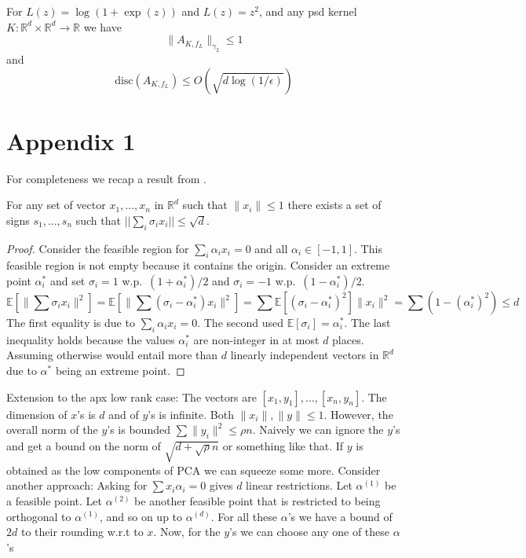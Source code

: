 \documentclass[anon,12pt]{colt2019} %
\newcommand{\R}{\mathbb{R}}
\newcommand{\E}{\mathbb{E}}
\newcommand{\eps}{\epsilon}
\newcommand{\disc}{\text{disc}}
\begin{document}
\begin{corollary}
For $L(z)=\log(1+\exp(z))$ and $L(z) = z^2$, and any psd kernel $K:\R^d \times \R^d \to \R$ we have
$$\|A_{K,f_L}\|_{\gamma_2} \leq 1 $$ 
and
$$\disc(A_{K,f_L}) \leq O(\sqrt{d\log(1/\eps)}) $$ 
\end{corollary}


%


\section{Appendix 1}
For completeness we recap a result from \cite{barany2008}.
\begin{theorem} \label{thm:random tensor}
For any set of vector $x_1,...,x_n$ in $\R^d$ such that $\|x_i\| \le 1$ there exists a set of signs $s_1,...,s_n$ such that $||\sum_i \sigma_i x_i || \le \sqrt{d}$.
\end{theorem}
\begin{proof}
Consider the feasible region for $\sum_i \alpha_i x_i = 0$ and all $\alpha_i \in [-1,1]$.
This feasible region is not empty because it contains the origin. 
Consider an extreme point $\alpha^*_i$ and set $\sigma_i = 1$ w.p.\ $(1+\alpha^*_i)/2$ and $\sigma_i = -1$ w.p.\ $(1-\alpha^*_i)/2$.
$$
\E[\|\sum \sigma_i x_i\|^2] =  \E[\|\sum (\sigma_i - \alpha^*_i) x_i\|^2] = \sum \E[(\sigma_i - \alpha^*_i)^2] \|x_i\|^2= \sum (1-(\alpha_i^*)^2) \le d
$$
The first equality is due to $\sum_i \alpha_i x_i = 0$. The second used $\E[\sigma_i] = \alpha^*_i $.
The last inequality holds because the values $\alpha^*_i$ are non-integer in at most $d$ places. 
Assuming otherwise would entail more than $d$ linearly independent vectors in $\R^d$ due to $\alpha^*$ being an extreme point.
\end{proof}

Extension to the apx low rank case: The vectors are $[x_1,y_1],\ldots,[x_n,y_n]$. The dimension of $x$'s is $d$ and of $y$'s is infinite. Both $\|x_i\|, \|y\| \leq 1$. However, the overall norm of the $y$'s is bounded $\sum \|y_i\|^2 \leq \rho n$. Naively we can ignore the $y$'s and get a bound on the norm of $\sqrt{d + \sqrt{\rho} n}$ or something like that. If $y$ is obtained as the low components of PCA we can squeeze some more.
Consider another approach: Asking for $\sum x_i \alpha_i =0 $ gives $d$ linear restrictions. Let $\alpha^{(1)}$ be a feasible point. Let $\alpha^{(2)}$ be another feasible point that is restricted to being orthogonal to $\alpha^{(1)}$, and so on up to $\alpha^{(d)}$. For all these $\alpha$'s we have a bound of $2d$ to their rounding w.r.t to $x$. Now, for the $y$'s we can choose any one of these $\alpha$'s
\end{document}
